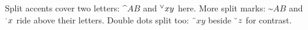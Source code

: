 \documentclass{article}
\begin{document}
Split accents cover two letters: $\sphat{AB}$ and $\spcheck{xy}$ here.
More split marks: $\sptilde{AB}$ and $\spdot{x}$ ride above their letters.
Double dots split too: $\spddot{xy}$ beside $\spbreve{z}$ for contrast.
\end{document}
